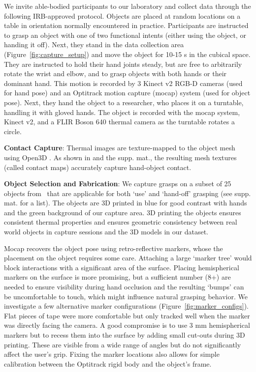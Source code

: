 \documentclass[runningheads]{llncs}
\begin{document}
We invite able-bodied participants to our laboratory and collect data through the following IRB-approved protocol. Objects are placed at random locations on a table in orientation normally encountered in practice. Participants are instructed to grasp an object with one of two functional intents (either using the object, or handing it off). Next, they stand in the data collection area (Figure~\ref{fig:capture_setup}) and move the object for 10-15 s in the cubical space. They are instructed to hold their hand joints steady, but are free to arbitrarily rotate the wrist and elbow, and to grasp objects with both hands or their dominant hand. This motion is recorded by 3 Kinect v2 RGB-D cameras (used for hand pose) and an Optitrack motion capture (mocap) system (used for object pose). Next, they hand the object to a researcher, who places it on a turntable, handling it with gloved hands. The object is recorded with the mocap system, Kinect v2, and a FLIR Boson 640 thermal camera as the turntable rotates a circle.

\noindent\textbf{Contact Capture}: Thermal images are texture-mapped to the object mesh using Open3D \cite{Zhou2018open3d, zhou2014color}. As shown in \cite{contactdbv1} and the supp. mat., the resulting mesh textures (called contact maps) accurately capture hand-object contact.

\noindent\textbf{Object Selection and Fabrication}: We capture grasps on a subset of 25 objects from~\cite{contactdbv1} that are applicable for both `use' and `hand-off' grasping (see supp. mat. for a list). The objects are 3D printed in blue for good contrast with hands and the green background of our capture area. 3D printing the objects ensures consistent thermal properties and ensures geometric consistency between real world objects in capture sessions and the 3D models in our dataset.

Mocap recovers the object pose using retro-reflective markers, whose the placement on the object requires some care.  Attaching a large `marker tree' would block interactions with a significant area of the surface.  Placing hemispherical markers on the surface is more promising, but a sufficient number (8+) are needed to ensure visibility during hand occlusion and the resulting `bumps' can be uncomfortable to touch, which might influence natural grasping behavior. We investigate a few alternative marker configurations (Figure~\ref{fig:marker_configs}).  Flat pieces of tape were more comfortable but only tracked well when the marker was directly facing the camera.  A good compromise is to use 3 mm hemispherical markers but to recess them into the surface by adding small cut-outs during 3D printing. These are visible from a wide range of angles but do not significantly affect the user's grip. Fixing the marker locations also allows for simple calibration between the Optitrack rigid body and the object's frame.
\end{document}
